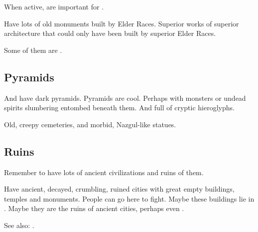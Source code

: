 When active,  are important for . 

Have lots of old monuments built by Elder Races. 
Superior works of superior architecture that could only have been built by superior Elder Races.

Some of them are . 










\subsection{Pyramids}
And have dark pyramids. 
Pyramids are cool. 
Perhaps with monsters or undead spirits slumbering entombed beneath them. 
And full of cryptic hieroglyphs. 

Old, creepy cemeteries, and morbid, Nazgul-like statues. 









\subsection{Ruins}
Remember to have lots of ancient civilizations and ruins of them. 

Have ancient, decayed, crumbling, ruined cities with great empty buildings, temples and monuments. 
People can go here to fight. 
Maybe these buildings lie in . 
Maybe they are the ruins of ancient \resphan{} cities, perhaps even \Merkyrah. 

See also: . 


